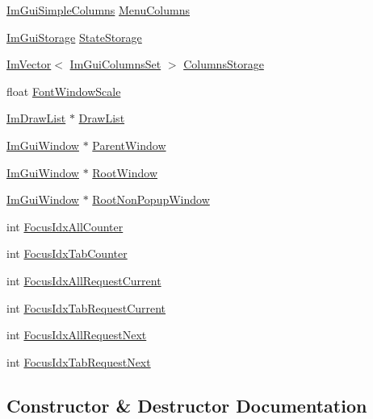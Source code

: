 \begin{DoxyCompactItemize}
\hyperlink{struct_im_gui_simple_columns}{Im\+Gui\+Simple\+Columns} \hyperlink{struct_im_gui_window_a9207bb87da58863ce60c08679ef19977}{Menu\+Columns}
\item 
\hyperlink{struct_im_gui_storage}{Im\+Gui\+Storage} \hyperlink{struct_im_gui_window_a2151ab67f2624bd606883ad346179486}{State\+Storage}
\item 
\hyperlink{class_im_vector}{Im\+Vector}$<$ \hyperlink{struct_im_gui_columns_set}{Im\+Gui\+Columns\+Set} $>$ \hyperlink{struct_im_gui_window_ac2ad7437b8960be8182ffde0788e1ec6}{Columns\+Storage}
\item 
float \hyperlink{struct_im_gui_window_a566ce9268a466afbbec78532d5cfa3c9}{Font\+Window\+Scale}
\item 
\hyperlink{struct_im_draw_list}{Im\+Draw\+List} $\ast$ \hyperlink{struct_im_gui_window_a39de4668b09754136c6fd7ab89ab674a}{Draw\+List}
\item 
\hyperlink{struct_im_gui_window}{Im\+Gui\+Window} $\ast$ \hyperlink{struct_im_gui_window_a5f0b37cb12fbeb3efe00d0cd826d5d65}{Parent\+Window}
\item 
\hyperlink{struct_im_gui_window}{Im\+Gui\+Window} $\ast$ \hyperlink{struct_im_gui_window_aef9281297b0993c8f1b7c1ff7987cb61}{Root\+Window}
\item 
\hyperlink{struct_im_gui_window}{Im\+Gui\+Window} $\ast$ \hyperlink{struct_im_gui_window_a43b1e2ffa15d572f4d0ce4fbbeb5595f}{Root\+Non\+Popup\+Window}
\item 
int \hyperlink{struct_im_gui_window_a51ee526aed5b993e0a849f2db1fdc4dc}{Focus\+Idx\+All\+Counter}
\item 
int \hyperlink{struct_im_gui_window_a7e3e75ec3d66d04801bfffdd02643d3c}{Focus\+Idx\+Tab\+Counter}
\item 
int \hyperlink{struct_im_gui_window_adfbeeeaa2eebd054ec0cd99dccb34f2f}{Focus\+Idx\+All\+Request\+Current}
\item 
int \hyperlink{struct_im_gui_window_a71c9ea6561a07160e5ce552db1d64b0b}{Focus\+Idx\+Tab\+Request\+Current}
\item 
int \hyperlink{struct_im_gui_window_a152487f402088ce413bb6c215b308c34}{Focus\+Idx\+All\+Request\+Next}
\item 
int \hyperlink{struct_im_gui_window_af7e93a1027da314fe73b64d97bfa73be}{Focus\+Idx\+Tab\+Request\+Next}
\end{DoxyCompactItemize}


\subsection{Constructor \& Destructor Documentation}
\hypertarget{struct_im_gui_window_acd2909ae3b7079de81d528327cc11dfd}{}\label{struct_im_gui_window_acd2909ae3b7079de81d528327cc11dfd} 
